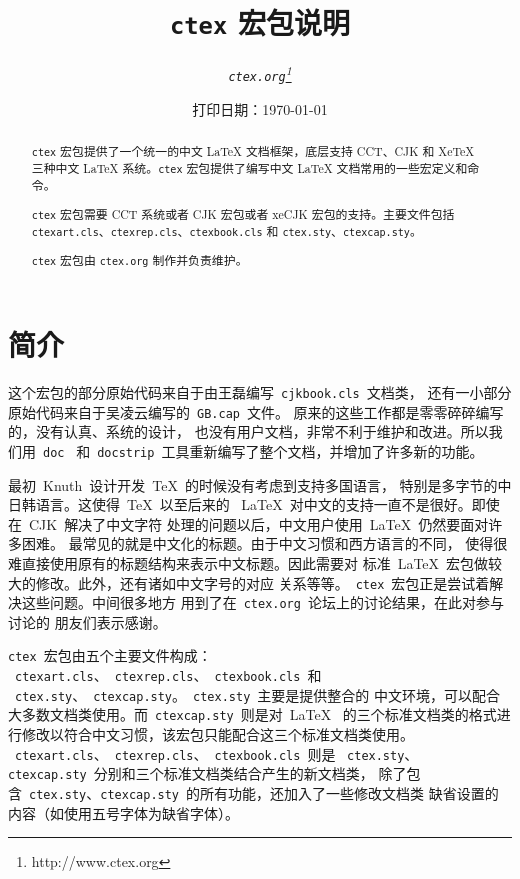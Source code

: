 \documentclass{ltxdoc}
\newcommand{\ctex}{\texttt{ctex}}
\newcommand{\ctexorg}{\texttt{ctex.org}}
\begin{document}
\title{\bf \ctex{} 宏包说明}
\author{\it \ctexorg\thanks{http://www.ctex.org}}
\date{\small 打印日期：\today}
\maketitle


\begin{abstract}
\ctex{} 宏包提供了一个统一的中文 \LaTeX{} 文档框架，底层支持 CCT、CJK 和 XeTeX 三种中文 \LaTeX{} 系统。\ctex{} 宏包提供了编写中文 \LaTeX{} 文档常用的一些宏定义和命令。

\ctex{} 宏包需要 CCT 系统或者 CJK 宏包或者 xeCJK 宏包的支持。主要文件包括 \texttt{ctexart.cls}、\texttt{ctexrep.cls}、\texttt{ctexbook.cls} 和 \texttt{ctex.sty}、\texttt{ctexcap.sty}。

\ctex{} 宏包由 \ctexorg{} 制作并负责维护。
\end{abstract}

\tableofcontents

\section{简介}

这个宏包的部分原始代码来自于由王磊编写~\texttt{cjkbook.cls}~文档类，
还有一小部分原始代码来自于吴凌云编写的~\texttt{GB.cap}~文件。
原来的这些工作都是零零碎碎编写的，没有认真、系统的设计，
也没有用户文档，非常不利于维护和改进。所以我们用~\texttt{doc}~
和~\texttt{docstrip}~工具重新编写了整个文档，并增加了许多新的功能。

最初~Knuth~设计开发~\TeX{}~的时候没有考虑到支持多国语言，
特别是多字节的中日韩语言。这使得~\TeX{}~以至后来的
~\LaTeX{}~对中文的支持一直不是很好。即使在~CJK~解决了中文字符
处理的问题以后，中文用户使用~\LaTeX{}~仍然要面对许多困难。
最常见的就是中文化的标题。由于中文习惯和西方语言的不同，
使得很难直接使用原有的标题结构来表示中文标题。因此需要对
标准~\LaTeX{}~宏包做较大的修改。此外，还有诸如中文字号的对应
关系等等。~\ctex{}~宏包正是尝试着解决这些问题。中间很多地方
用到了在~\ctexorg{}~论坛上的讨论结果，在此对参与讨论的
朋友们表示感谢。

\ctex{}~宏包由五个主要文件构成：
~\texttt{ctexart.cls}、~\texttt{ctexrep.cls}、~\texttt{ctexbook.cls}~和
~\texttt{ctex.sty}、~\texttt{ctexcap.sty}。~\texttt{ctex.sty}~主要是提供整合的
中文环境，可以配合大多数文档类使用。而~\texttt{ctexcap.sty}~则是对~\LaTeX{}~
的三个标准文档类的格式进行修改以符合中文习惯，该宏包只能配合这三个标准文档类使用。
~\texttt{ctexart.cls}、~\texttt{ctexrep.cls}、~\texttt{ctexbook.cls}~则是
~\texttt{ctex.sty}、\texttt{ctexcap.sty}~分别和三个标准文档类结合产生的新文档类，
除了包含~\texttt{ctex.sty}、\texttt{ctexcap.sty}~的所有功能，还加入了一些修改文档类
缺省设置的内容（如使用五号字体为缺省字体）。
\end{document}
